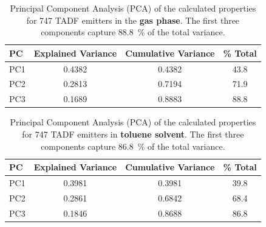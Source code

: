 \documentclass[journal=jcisd8,manuscript=article,keywords=true]{achemso}
\begin{document}
\begin{table}[!ht]
\centering
\caption{Principal Component Analysis (PCA) of the calculated properties for \num{747}
TADF emitters in the \textbf{gas phase}. The first three components capture
\qty{88.8}{\percent} of the total variance.}
\label{tab:pca}
\begin{tabular}{l*{2}{S[table-format=1.4]}S[table-format=2.1]}
	\toprule
	{PC} & {Explained Variance} & {Cumulative Variance} & {\unit{\percent} Total} \\
\midrule
	PC1  & 0.4382               & 0.4382                & 43.8       \\
	PC2  & 0.2813               & 0.7194                & 71.9       \\
	PC3  & 0.1689               & 0.8883                & 88.8       \\ \bottomrule
\end{tabular}
\end{table}

\begin{table}[!ht]
\centering
\caption{Principal Component Analysis (PCA) of the calculated properties for \num{747}
TADF emitters in \textbf{toluene solvent}. The first three components capture
\qty{86.8}{\percent} of the total variance.}
\label{tab:pcaTol}
\begin{tabular}{l*{2}{S[table-format=1.4]}S[table-format=2.1]}
	\toprule
	{PC} & {Explained Variance} & {Cumulative Variance} & {\unit{\percent} Total} \\
\midrule
	PC1  & 0.3981               & 0.3981                & 39.8       \\
	PC2  & 0.2861               & 0.6842                & 68.4       \\
	PC3  & 0.1846               & 0.8688                & 86.8       \\ \bottomrule
\end{tabular}
\end{table}
\end{document}
